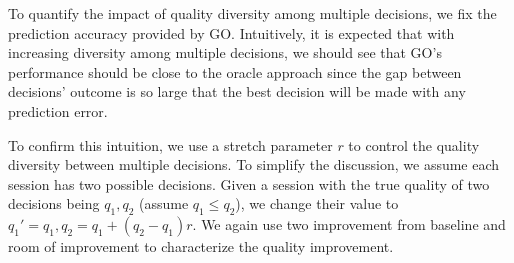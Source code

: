 


\label{subsec:impact-diversity}

To quantify the impact of quality diversity among multiple decisions, we fix the prediction accuracy provided by GO. Intuitively, it is expected that with increasing diversity among multiple decisions, we should see that GO's performance should be close to the oracle approach since the gap between decisions' outcome is so large that the best decision will be made with any prediction error. 

To confirm this intuition, we use a stretch parameter $r$ to control the quality diversity between multiple decisions. To simplify the discussion, we assume each session has two possible decisions. Given a session with the true quality of two decisions being $q_1, q_2$ (assume $q_1\leq q_2$), we change their value to $q_1'=q_1, q_2=q_1+(q_2-q_1)r$. We again use two improvement from baseline and room of improvement to characterize the quality improvement.

\begin{figure}[h!]
\centering
{}
\hspace{-0.6cm}
\label{fig:trace-diversity}
\end{figure}

